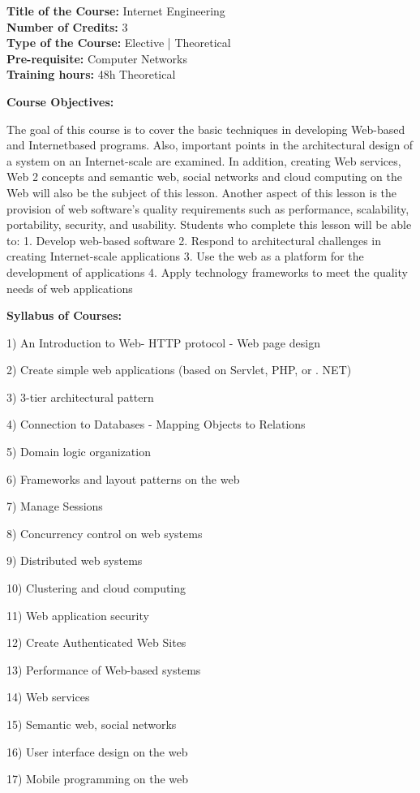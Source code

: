 \documentclass[12pt,a4paper]{article}
\begin{document}
\newpage
\textbf{Title of the Course:} Internet Engineering\\
\textbf{Number of Credits:} 3\\
\textbf{Type of the Course:} Elective | Theoretical\\
\textbf{Pre-requisite:} Computer Networks\\
\textbf{Training hours:} 48h Theoretical\par\vspace{4pt}
\textbf{Course Objectives:}\par\vspace{2pt}
The goal of this course is to cover the basic techniques in developing Web-based and Internetbased programs. Also, important points in the architectural design of a system on an Internet-scale
are examined. In addition, creating Web services, Web 2 concepts and semantic web, social
networks and cloud computing on the Web will also be the subject of this lesson. Another aspect
of this lesson is the provision of web software’s quality requirements such as performance,
scalability, portability, security, and usability.
Students who complete this lesson will be able to:
1. Develop web-based software
2. Respond to architectural challenges in creating Internet-scale applications
3. Use the web as a platform for the development of applications
4. Apply technology frameworks to meet the quality needs of web applications\par\vspace{4pt}
\textbf{Syllabus of Courses:}\par\vspace{2pt}
1) An Introduction to Web- HTTP protocol - Web page design\par
2) Create simple web applications (based on Servlet, PHP, or . NET)\par
3) 3-tier architectural pattern\par
4) Connection to Databases - Mapping Objects to Relations\par
5) Domain logic organization\par
6) Frameworks and layout patterns on the web\par
7) Manage Sessions\par
8) Concurrency control on web systems\par
9) Distributed web systems\par
10) Clustering and cloud computing\par
11) Web application security\par
12) Create Authenticated Web Sites\par
13) Performance of Web-based systems\par
14) Web services\par
15) Semantic web, social networks\par
16) User interface design on the web\par
17) Mobile programming on the web\par\vspace{4pt}
\end{document}
